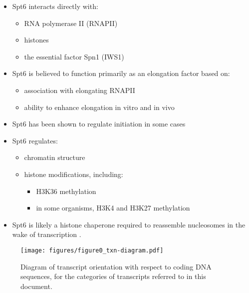 \documentclass[9pt, letterpaper]{article}
\begin{document}
\begin{itemize}[nosep, topsep=.5em]
\item Spt6 interacts directly with:
	\begin{itemize}[nosep]
	\item RNA polymerase II (RNAPII) \cite{close2011, diebold2011, liu2011, sdano2017, sun2010, yoh2007}
	\item histones \cite{bortvin1996, mccullough2015}
	\item the essential factor Spn1 (IWS1) \cite{diebold2010b, li2018, mcdonald2010}
	\end{itemize}
\item Spt6 is believed to function primarily as an elongation factor based on:
	\begin{itemize}[nosep]
	\item association with elongating RNAPII \cite{andrulis2000, ivanovska2011, kaplan2000, mayer2010}
	\item ability to enhance elongation in vitro \cite{endoh2004} and in vivo \cite{ardehali2009}
	\end{itemize}
\item Spt6 has been shown to regulate initiation in some cases \cite{adkins2006, ivanovska2011}
\item Spt6 regulates:
	\begin{itemize}[nosep]
	\item chromatin structure \cite{bortvin1996, degennaro2013, ivanovska2011, jeronimo2015, kaplan2003, perales2013, vanbakel2013}
	\item histone modifications, including:
		\begin{itemize}[nosep]
		\item H3K36 methylation \cite{carrozza2005, chu2006, yoh2008, youdell2008}
		\item in some organisms, H3K4 and H3K27 methylation \cite{begum2012, chen2012, degennaro2013, wang2017, wang2013}
		\end{itemize}
	\end{itemize}
\item Spt6 is likely a histone chaperone required to reassemble nucleosomes in the wake of transcription \cite{duina2011}.
\end{itemize}

\begin{wrapfigure}[9]{r}{7.02cm}
\centering
\texttt{[image: figures/figure0\_txn-diagram.pdf]}
\caption{Diagram of transcript orientation with respect to coding DNA sequences, for the categories of transcripts referred to in this document.}
\label{fig:txn-diagram}
\end{wrapfigure}
\end{document}
